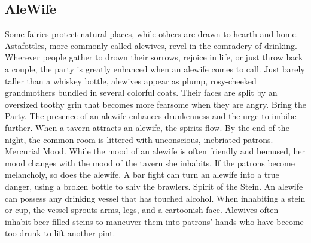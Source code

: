\documentclass[10pt,a4paper,twoside,twocolumn,openany,bg=print,nodeprecatedcode]{dndbook}
\begin{document}
\subsection{AleWife}
Some fairies protect natural places, while others are drawn to hearth and home. Astafottles, more commonly called alewives, revel in the comradery of drinking. Wherever people gather to drown their sorrows, rejoice in life, or just throw back a couple, the party is greatly enhanced when an alewife comes to call.
Just barely taller than a whiskey bottle, alewives appear as plump, rosy-cheeked grandmothers bundled in several colorful coats. Their faces are split by an oversized toothy grin that becomes more fearsome when they are angry.
Bring the Party. The presence of an alewife enhances drunkenness and the urge to imbibe further. When a tavern attracts an alewife, the spirits flow. By the end of the night, the common room is littered with unconscious, inebriated patrons.
Mercurial Mood. While the mood of an alewife is often friendly and bemused, her mood changes with the mood of the tavern she inhabits. If the patrons become melancholy, so does the alewife. A bar fight can turn an alewife into a true danger, using a broken bottle to shiv the brawlers.
Spirit of the Stein. An alewife can possess any drinking vessel that has touched alcohol. When inhabiting a stein or cup, the vessel sprouts arms, legs, and a cartoonish face. Alewives often inhabit beer-filled steins to maneuver them into patrons' hands who have become too drunk to lift another pint.
\end{document}
